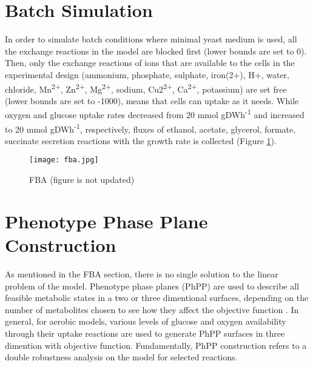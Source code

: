 


\section{Batch Simulation}
In order to simulate batch conditions where minimal yeast medium is used, all the exchange reactions in the model are blocked first (lower bounds are set to 0). Then, only the exchange reactions of ions that are available to the cells in the experimental design (ammonium, phosphate, sulphate, iron(2+), H+, water, chloride, Mn\textsuperscript{2+}, Zn\textsuperscript{2+}, Mg\textsuperscript{2+}, sodium, Cu2\textsuperscript{2+}, Ca\textsuperscript{2+}, potassium) are set free (lower bounds are set to -1000), means that cells can uptake as it needs. While oxygen and glucose uptake rates decreased from 20 mmol gDWh\textsuperscript{-1} and increased to 20 mmol gDWh\textsuperscript{-1}, respectively, fluxes of ethanol, acetate, glycerol, formate, succinate secretion reactions with the growth rate is collected (Figure \ref{fig:fba}).

\begin{figure}[H]
\begin{center}
\texttt{[image: fba.jpg]}
\end{center}
\caption[FBA]{FBA (figure is not updated)}
\label{fig:fba}
\end{figure}


\section{Phenotype Phase Plane Construction}

As mentioned in the FBA section, there is no single solution to the linear problem of the model. Phenotype phase planes (PhPP) are used to describe all feasible metabolic states in a two or three dimentional surfaces, depending on the number of metabolites chosen to see how they affect the objective function \cite{edwards2002characterizing}. In general, for aerobic models, various levels of glucose and oxygen availability through their uptake reactions are used to generate PhPP surfaces in three dimention with objective function. Fundamentally, PhPP construction refers to a double robustness analysis on the model for selected reactions.

